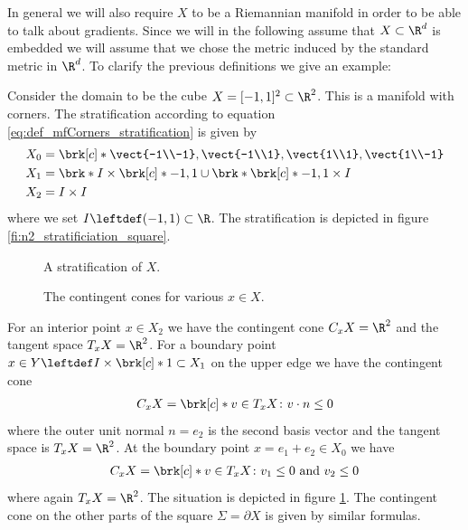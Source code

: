 In general we will also require $X$ to be a Riemannian manifold in order to be able to talk about
gradients.
Since we will in the following assume that $X\subset\R^d$ is embedded we will assume that
we chose the metric induced by the standard metric in $\R^d$.
%
To clarify the previous definitions we give an example:
\begin{example}
  Consider the domain to be the cube $X=[-1,1]^2\subset\R^2$.
  This is a manifold with corners.
  The stratification according to equation \eqref{eq:def_mfCorners_stratification} is given by
  \begin{align*}
    X_0&=\brk[c]*{\vect{-1\\-1},\vect{-1\\1},\vect{1\\1},\vect{1\\-1}}\\
    X_1&=\brk*{I\times\brk[c]*{-1,1}}\cup\brk*{ \brk[c]*{-1,1}\times I}\\
    X_2&=I\times I
  \end{align*}
  where we set $I\leftdef(-1,1)\subset\R$.
  The stratification is depicted in figure \ref{fi:n2_stratificiation_square}.
  \begin{figure}
    \centering
    \begin{minipage}[h]{0.35\textwidth}
      
      \caption{A stratification of $X$.}
      \label{fi:n2_stratificiation_square}
    \end{minipage}
    \hfill
    \begin{minipage}[h]{0.6\textwidth}
      
      \caption{The contingent cones for various $x\in X$.}
      \label{fi:n2_tangencyCone_square}
    \end{minipage}
  \end{figure}
  For an interior point $x\in X_2$ we have 
  the contingent cone $C_xX=\R^2$ and the tangent space $T_xX=\R^2$.
  For a boundary point $x\in Y\leftdef I\times \brk[c]*{1}\subset X_1$ on the upper edge we have the contingent cone
  \begin{align}
    C_xX=\brk[c]*{v\in T_xX\colon v\cdot n\leq 0}\label{eq:n2_cube_boundaryPt}
  \end{align}
  where the outer unit normal $n=e_2$ is the second basis vector and the 
  tangent space is $T_xX=\R^2$. At the boundary point $x=e_1+e_2\in X_0$ we have
  \begin{align}
    C_xX=\brk[c]*{v\in T_xX\colon v_1\leq0\text{ and }v_2\leq 0}\label{eq:n2_cube_cornerPt}
  \end{align}
  where again $T_xX=\R^2$.
  The situation is depicted in figure \ref{fi:n2_tangencyCone_square}.
  The contingent cone on the other parts of the square $\Sigma=\partial X$ is given by similar formulas.
\end{example}


